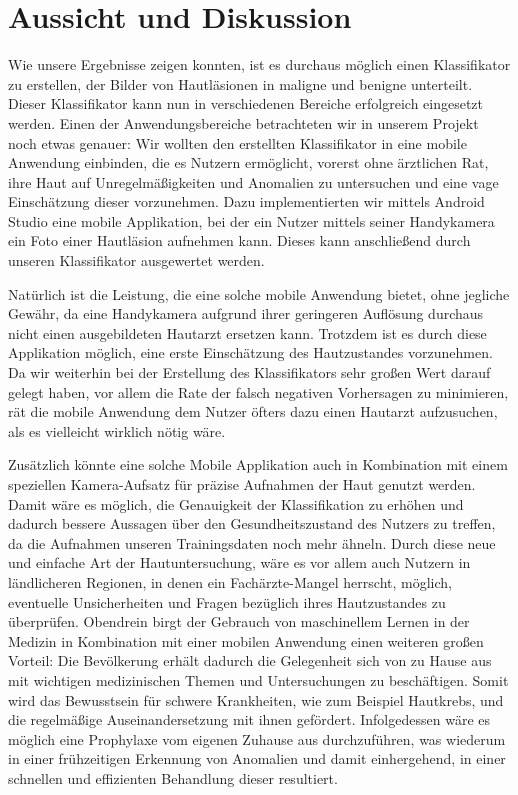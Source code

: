 \section{Aussicht und Diskussion}

Wie unsere Ergebnisse zeigen konnten, ist es durchaus möglich einen Klassifikator zu erstellen, der Bilder von Hautläsionen in maligne und benigne unterteilt. Dieser Klassifikator kann nun in verschiedenen Bereiche erfolgreich eingesetzt werden. Einen der Anwendungsbereiche betrachteten wir in unserem Projekt noch etwas genauer: Wir wollten den erstellten Klassifikator in eine mobile Anwendung einbinden, die es Nutzern ermöglicht, vorerst ohne ärztlichen Rat, ihre Haut auf Unregelmäßigkeiten und Anomalien zu untersuchen und eine vage Einschätzung dieser vorzunehmen. Dazu implementierten wir mittels Android Studio eine mobile Applikation, bei der ein Nutzer mittels seiner Handykamera ein Foto einer Hautläsion aufnehmen kann. Dieses kann anschließend durch unseren Klassifikator ausgewertet werden. 

Natürlich ist die Leistung, die eine solche mobile Anwendung bietet, ohne jegliche Gewähr, da eine Handykamera aufgrund ihrer geringeren Auflösung durchaus nicht einen ausgebildeten Hautarzt ersetzen kann. Trotzdem ist es durch diese Applikation möglich, eine erste Einschätzung des Hautzustandes vorzunehmen. Da wir weiterhin bei der Erstellung des Klassifikators sehr großen Wert darauf gelegt haben, vor allem die Rate der falsch negativen Vorhersagen zu minimieren, rät die mobile Anwendung dem Nutzer öfters dazu einen Hautarzt aufzusuchen, als es vielleicht wirklich nötig wäre. 

Zusätzlich könnte eine solche Mobile Applikation auch in Kombination mit einem speziellen Kamera-Aufsatz für präzise Aufnahmen der Haut genutzt werden. Damit wäre es möglich, die Genauigkeit der Klassifikation zu erhöhen und dadurch bessere Aussagen über den Gesundheitszustand des Nutzers zu treffen, da die Aufnahmen unseren Trainingsdaten noch mehr ähneln. Durch diese neue und einfache Art der Hautuntersuchung, wäre es vor allem auch Nutzern in ländlicheren Regionen, in denen ein Fachärzte-Mangel herrscht, möglich, eventuelle Unsicherheiten und Fragen bezüglich ihres Hautzustandes zu überprüfen. Obendrein birgt der Gebrauch von maschinellem Lernen in der Medizin in Kombination mit einer mobilen Anwendung einen weiteren großen Vorteil: Die Bevölkerung erhält dadurch die Gelegenheit sich von zu Hause aus mit wichtigen medizinischen Themen und Untersuchungen zu beschäftigen. Somit wird das Bewusstsein für schwere Krankheiten, wie zum Beispiel Hautkrebs, und die regelmäßige Auseinandersetzung mit ihnen gefördert. Infolgedessen wäre es möglich eine Prophylaxe vom eigenen Zuhause aus durchzuführen, was wiederum in einer frühzeitigen Erkennung von Anomalien und damit einhergehend, in einer schnellen und effizienten Behandlung dieser resultiert.

